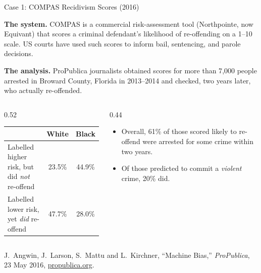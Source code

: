 
\begin{frame}{Case 1: COMPAS Recidivism Scores (2016)}

    \textbf{The system.} COMPAS is a commercial risk-assessment tool (Northpointe, now Equivant)
    that scores a criminal defendant's likelihood of re-offending on a 1--10 scale. US courts have
    used such scores to inform bail, sentencing, and parole decisions.

    \vspace{0.8em}

    \textbf{The analysis.} ProPublica journalists obtained scores for more than 7{,}000 people
    arrested in Broward County, Florida in 2013--2014 and checked, two years later, who actually
    re-offended.

    \vspace{0.8em}

    \begin{columns}[T]
        \begin{column}{0.52\textwidth}
            \centering
            \small
            \begin{tabular}{p{3.5cm}cc}
                \toprule
                & \textbf{White} & \textbf{Black} \\
                \midrule
                Labelled higher risk, but did \emph{not} re-offend & 23.5\% & 44.9\% \\
                \addlinespace
                Labelled lower risk, yet \emph{did} re-offend & 47.7\% & 28.0\% \\
                \bottomrule
            \end{tabular}
        \end{column}
        \begin{column}{0.44\textwidth}
            \begin{itemize}\small
                \item Overall, 61\% of those scored likely to re-offend were arrested for some
                      crime within two years.
                \item Of those predicted to commit a \emph{violent} crime, 20\% did.
            \end{itemize}
        \end{column}
    \end{columns}

    \vspace{0.5em}
    {\scriptsize J.~Angwin, J.~Larson, S.~Mattu and L.~Kirchner, ``Machine Bias,'' \emph{ProPublica},
    23 May 2016, \href{https://www.propublica.org/article/machine-bias-risk-assessments-in-criminal-sentencing}{propublica.org}.}
\end{frame}
